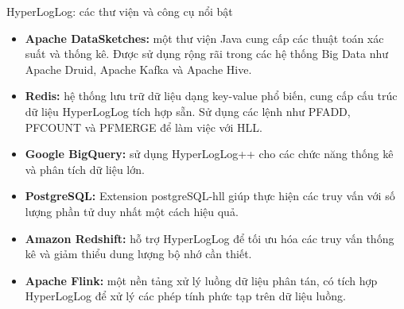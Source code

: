 \documentclass[10pt]{beamer}
\begin{document}
\begin{frame}{HyperLogLog: các thư viện và công cụ nổi bật }
  \begin{itemize}
    \item \textbf{Apache DataSketches:} một thư viện Java cung cấp các thuật toán xác suất và thống kê. Được sử dụng rộng rãi trong các hệ thống Big Data như 
    Apache Druid, Apache Kafka và Apache Hive.
    \item \textbf{Redis:} hệ thống lưu trữ dữ liệu dạng key-value phổ biến, cung cấp 
    cấu trúc dữ liệu HyperLogLog tích hợp sẵn. Sử dụng các lệnh như PFADD, PFCOUNT 
    và PFMERGE để làm việc với HLL.
    \item \textbf{Google BigQuery:} sử dụng HyperLogLog++ cho các chức năng thống kê và phân tích dữ liệu lớn.
    \item \textbf{PostgreSQL:} Extension postgreSQL-hll giúp thực hiện các truy vấn với số lượng phần tử duy nhất một cách hiệu quả.
    \item \textbf{Amazon Redshift:} hỗ trợ HyperLogLog để tối ưu hóa các truy vấn thống kê và giảm thiểu dung lượng bộ nhớ cần thiết.
    \item \textbf{Apache Flink:} một nền tảng xử lý luồng dữ liệu phân tán, 
    có tích hợp HyperLogLog để xử lý các phép tính phức tạp trên dữ liệu luồng.
  \end{itemize}
\end{frame}
\end{document}

